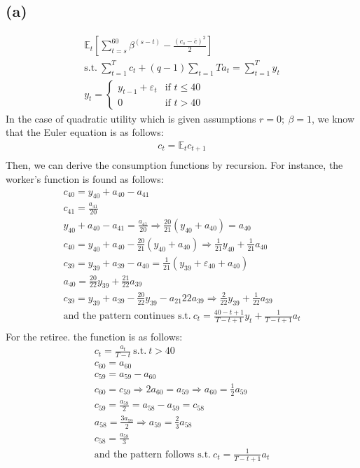 \documentclass[10pt,a4paper]{article}
\newcommand{\sumt}{\sum\limits_{t=1}^{T}}
\newcommand{\sumtb}{\sum\limits_{t=s}^{60}}
\begin{document}
    \subsection*{(a)}
      \begin{gather*}
          \mathbb{E}_t[\sumtb\beta^{(s-t)} -\frac{(c_s-\bar{c})^2}{2}] \\
          \text{s.t.} \ \sumt c_t + (q-1)\sum\limits_{t=1}{T}a_{t} = \sumt y_t \\
          y_t = \begin{cases} 
          y_{t-1} + \varepsilon_t & \text{if } t \leq 40 \\
          0 & \text{if } t > 40 
          \end{cases}
      \end{gather*}
      In the case of quadratic utility which is given assumptions $r=0; \ \beta=1$, we know that the
      Euler equation is as follows:
      \begin{gather*}
          c_t = \mathbb{E}_tc_{t+1} \\
      \end{gather*}
      Then, we can derive the consumption functions by recursion. For instance, the worker's function is found as follows:
      \begin{gather*}
        c_{40} = y_{40} + a_{40} - a_{41} \\
        c_{41} = \frac{a_{41}}{20} \\
        y_{40} + a_{40} - a_{41} = \frac{a_{41}}{20} \Rightarrow \frac{20}{21}(y_{40}+a_{40}) = a_{40} \\
        c_{40} = y_{40} + a_{40} - \frac{20}{21}(y_{40}+a_{40}) \Rightarrow \frac{1}{21}y_{40} + \frac{1}{21}a_{40} \\
        c_{39} = y_{39} + a_{39} - a_{40} = \frac{1}{21}(y_{39} + \varepsilon_{40} + a_{40}) \\
        a_{40} = \frac{20}{22}y_{39} + \frac{21}{22}a_{39} \\
        c_{39} = y_{39} + a_{39} - \frac{20}{22}y_{39} - a_{21}{22}a_{39} \Rightarrow \frac{2}{22}y_{39} + \frac{1}{22}a_{39} \\
        \text{and the pattern continues s.t.} \ c_t = \frac{40-t+1}{T-t+1}y_t + \frac{1}{T-t+1}a_t \\
      \end{gather*}
      For the retiree. the function is as follows:
      \begin{gather*}
        c_t = \frac{a_t}{T-t} \ \text{s.t.} \ t > 40  \\
        c_{60} = a_{60} \\
        c_{59} = a_{59}-a_{60} \\
        c_{60} = c_{59} \Rightarrow 2a_{60} = a_{59} \Rightarrow a_{60} = \frac{1}{2}a_{59} \\
        c_{59} = \frac{a_{59}}{2} = a_{58} - a_{59} = c_{58} \\
        a_{58} = \frac{3a_{59}}{2} \Rightarrow a_{59} = \frac{2}{3}a_{58} \\
        c_{58} = \frac{a_{58}}{3} \\
        \text{and the pattern follows s.t.} \ c_{t} = \frac{1}{T-t+1}a_t
      \end{gather*}
\end{document}
